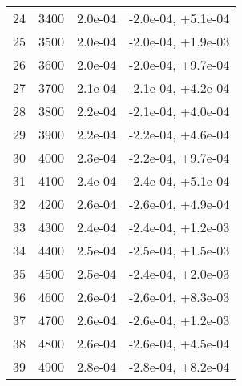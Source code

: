 \begin{table}
\begin{adjustbox}{width=1\textwidth/2}
\begin{tabular}{|c|c|c|c|}
\cline{1-4}
24 & 3400 & 2.0e-04 & -2.0e-04, +5.1e-04 \\
\cline{1-4}
25 & 3500 & 2.0e-04 & -2.0e-04, +1.9e-03 \\
\cline{1-4}
26 & 3600 & 2.0e-04 & -2.0e-04, +9.7e-04 \\
\cline{1-4}
27 & 3700 & 2.1e-04 & -2.1e-04, +4.2e-04 \\
\cline{1-4}
28 & 3800 & 2.2e-04 & -2.1e-04, +4.0e-04 \\
\cline{1-4}
29 & 3900 & 2.2e-04 & -2.2e-04, +4.6e-04 \\
\cline{1-4}
30 & 4000 & 2.3e-04 & -2.2e-04, +9.7e-04 \\
\cline{1-4}
31 & 4100 & 2.4e-04 & -2.4e-04, +5.1e-04 \\
\cline{1-4}
32 & 4200 & 2.6e-04 & -2.6e-04, +4.9e-04 \\
\cline{1-4}
33 & 4300 & 2.4e-04 & -2.4e-04, +1.2e-03 \\
\cline{1-4}
34 & 4400 & 2.5e-04 & -2.5e-04, +1.5e-03 \\
\cline{1-4}
35 & 4500 & 2.5e-04 & -2.4e-04, +2.0e-03 \\
\cline{1-4}
36 & 4600 & 2.6e-04 & -2.6e-04, +8.3e-03 \\
\cline{1-4}
37 & 4700 & 2.6e-04 & -2.6e-04, +1.2e-03 \\
\cline{1-4}
38 & 4800 & 2.6e-04 & -2.6e-04, +4.5e-04 \\
\cline{1-4}
39 & 4900 & 2.8e-04 & -2.8e-04, +8.2e-04 \\
\cline{1-4}
\end{tabular}
\end{adjustbox}
\end{table}

